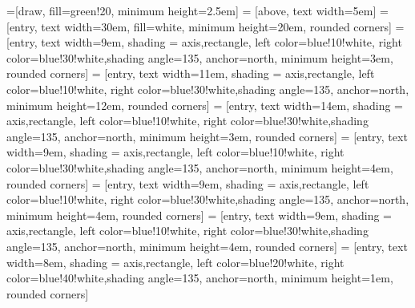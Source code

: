 
\usetikzlibrary{calc,positioning}
\usetikzlibrary{arrows.meta}

=[draw, fill=green!20, minimum height=2.5em]
 = [above, text width=5em]
 = [entry, text width=30em, fill=white, 
minimum height=20em, rounded corners]
 = [entry, text width=9em, shading = axis,rectangle, left color=blue!10!white, right color=blue!30!white,shading angle=135, anchor=north,
minimum height=3em, rounded corners]
 = [entry, text width=11em, shading = axis,rectangle, left color=blue!10!white, right color=blue!30!white,shading angle=135, anchor=north,
minimum height=12em, rounded corners]
 = [entry, text width=14em, shading = axis,rectangle, left color=blue!10!white, right color=blue!30!white,shading angle=135, anchor=north,
minimum height=3em, rounded corners]
 = [entry, text width=9em, shading = axis,rectangle, left color=blue!10!white, right color=blue!30!white,shading angle=135, anchor=north,
minimum height=4em, rounded corners]
 = [entry, text width=9em, shading = axis,rectangle, left color=blue!10!white, right color=blue!30!white,shading angle=135, anchor=north,
minimum height=4em, rounded corners]
 = [entry, text width=9em, shading = axis,rectangle, left color=blue!10!white, right color=blue!30!white,shading angle=135, anchor=north,
minimum height=4em, rounded corners]
 = [entry, text width=8em, shading = axis,rectangle, left color=blue!20!white, right color=blue!40!white,shading angle=135, anchor=north,
minimum height=1em, rounded corners]
\def\blockdist{2.3}
\def\edgedist{2.5}

